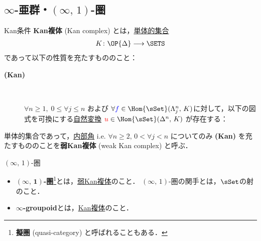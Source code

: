 \documentclass[TQFT_main]{subfiles}
\begin{document}
\subsection{$\infty$-亜群・$(\infty,\, 1)$-圏}

\begin{mydef}[label=def:KanCplx,breakable]{Kan条件}
    \textbf{Kan複体} (Kan complex) とは，\hyperref[def:SimpSet]{単体的集合}
    \begin{align}
        K \colon \OP{\Delta} \lto \SETS
    \end{align}
    であって以下の性質を充たすもののこと：

    \begin{description}
        \item[\textbf{(Kan)}]　
        
        $\forall n \ge 1,\; 0 \le \forall j \le n$ および $\forall \textcolor{blue}{f} \in \Hom{\sSet}(\Lambda^n_j,\, K)$に対して，以下の図式を可換にする\hyperref[def:nat]{自然変換} $\textcolor{red}{u} \in \Hom{\sSet}(\Delta^n,\, K)$ が存在する：
        \begin{center}
        \end{center}
        
    \end{description}
    
    \tcblower

    単体的集合であって，\hyperref[def:horn]{内部角} i.e. $\forall n \ge 2,\, 0 < \forall j < n$ についてのみ \textsf{\textbf{(Kan)}} を充たすもののことを\textbf{弱Kan複体} (weak Kan complex) と呼ぶ．
\end{mydef}

\begin{mydef}[label=def:infinity-1]{{$(\infty,\, 1)$}-圏}
    \begin{itemize}
        \item $\bm{(\infty,\, 1)}$\textbf{-圏}\footnote{\textbf{擬圏} (quasi-category) と呼ばれることもある．}とは，\hyperref[def:KanCplx]{弱Kan複体}のこと．
        $(\infty,\, 1)$-圏の関手とは，\hyperref[def:SimpSet]{$\sSet$}の射のこと．
        \item $\bm{\infty}$\textbf{-groupoid}とは，\hyperref[def:KanCplx]{Kan複体}のこと．
    \end{itemize}
\end{mydef}
\end{document}
